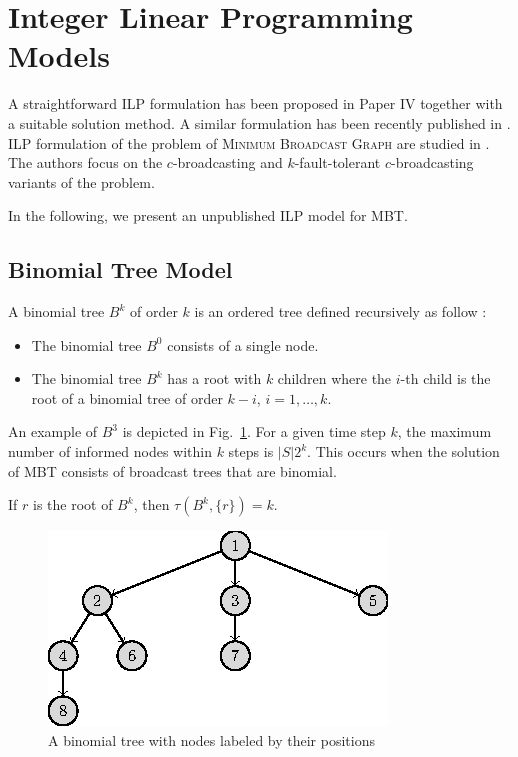 \section{Integer Linear Programming Models}

A straightforward ILP formulation has been proposed in Paper IV together with a suitable solution method.
A similar formulation has been recently published in \cite{desousa18}.
ILP formulation of the problem of \textsc{Minimum Broadcast Graph} are studied in \cite{mcgarvey16}.
The authors focus on the $c$-broadcasting  and $k$-fault-tolerant $c$-broadcasting variants of the problem.

In the following, we present an unpublished ILP model for MBT.

\subsection{Binomial Tree Model}

A binomial tree $B^k$ of order $k$ is an ordered tree defined recursively as follow \cite{cormen01}:
\begin{itemize}
\item The binomial tree $B^0$ consists of a single node.
\item The binomial tree $B^k$ has a root with $k$ children where the $i$-th child is the root of a binomial tree of order $k-i$, $i=1,\dots,k$.
\end{itemize}
An example of $B^3$ is depicted in Fig.~\ref{fig:beta}.
For a given time step $k$, the maximum number of informed nodes within $k$ steps is $|S|2^k$.
This occurs when the solution of MBT consists of broadcast trees that are binomial.
\begin{observation}
\label{obs:btspread}
If $r$ is the root of $B^k$, then $\tau(B^k,\{r\})=k$.
\end{observation}
\begin{figure}
\centering
	\includegraphics{figurer/btindex.eps}
\caption{A binomial tree with nodes labeled by their positions}
\label{fig:beta}
\end{figure}

